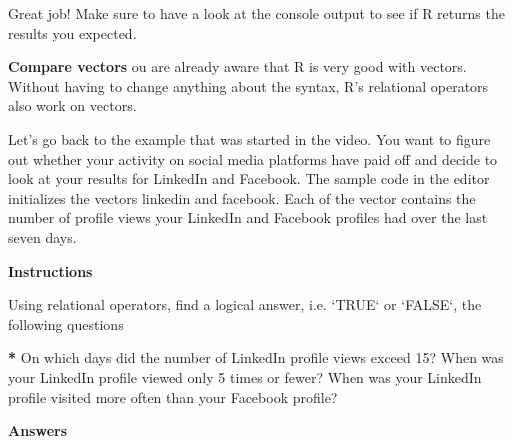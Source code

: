 \documentclass[]{article}
\newcommand{\hlnum}[1]{\textcolor[rgb]{0.816,0.125,0.439}{#1}}%
\newcommand{\hlstr}[1]{\textcolor[rgb]{0.251,0.627,0.251}{#1}}%
\newcommand{\hlstd}[1]{\textcolor[rgb]{0.251,0.251,0.251}{#1}}%
\newcommand{\hlkwc}[1]{\textcolor[rgb]{0.251,0.251,0.251}{#1}}%
\newenvironment{Shaded}{\begin{myshaded}}{\end{myshaded}}
\newcommand{\DataTypeTok}[1]{\hlkwc{#1}}
\newcommand{\DecValTok}[1]{\hlnum{#1}}
\newcommand{\StringTok}[1]{\hlstr{#1}}
\newcommand{\ErrorTok}[1]{\textbf{{#1}}}
\newcommand{\NormalTok}[1]{\hlstd{#1}}
\begin{document}
Great job! Make sure to have a look at the console output to see if R
returns the results you expected.

\textbf{Compare vectors} ou are already aware that R is very good with
vectors. Without having to change anything about the syntax, R's
relational operators also work on vectors.

Let's go back to the example that was started in the video. You want to
figure out whether your activity on social media platforms have paid off
and decide to look at your results for LinkedIn and Facebook. The sample
code in the editor initializes the vectors linkedin and facebook. Each
of the vector contains the number of profile views your LinkedIn and
Facebook profiles had over the last seven days.

\textbf{Instructions}

\begin{Shaded}
\begin{Highlighting}[]
\NormalTok{Using relational operators, find a logical answer, i.e. }\StringTok{`}\DataTypeTok{TRUE}\StringTok{`}\NormalTok{ or }\StringTok{`}\DataTypeTok{FALSE}\StringTok{`}\NormalTok{, }\NormalTok{ the following questions}\OperatorTok{:}

\ErrorTok{*}\StringTok{ }\NormalTok{On which days did the number of LinkedIn profile views exceed }\DecValTok{15}\NormalTok{?}
\OperatorTok{*}\StringTok{ }\NormalTok{When was your LinkedIn profile viewed only }\DecValTok{5}\NormalTok{ times or fewer?}
\OperatorTok{*}\StringTok{ }\NormalTok{When was your LinkedIn profile visited more often than your Facebook profile?}
\end{Highlighting}
\end{Shaded}

\textbf{Answers}
\end{document}
